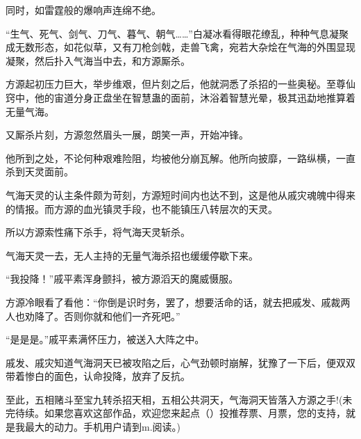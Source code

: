 \begin{this_body}
同时，如雷霆般的爆响声连绵不绝。

“生气、死气、剑气、刀气、暮气、朝气……”白凝冰看得眼花缭乱，种种气息凝聚成无数形态，如花似草，又有刀枪剑戟，走兽飞禽，宛若大杂烩在气海的外围显现凝聚，然后扑入气海当中去，和方源厮杀。

方源起初压力巨大，举步维艰，但片刻之后，他就洞悉了杀招的一些奥秘。至尊仙窍中，他的宙道分身正盘坐在智慧蛊的面前，沐浴着智慧光晕，极其迅勐地推算着无量气海。

又厮杀片刻，方源忽然眉头一展，朗笑一声，开始冲锋。

他所到之处，不论何种艰难险阻，均被他分崩瓦解。他所向披靡，一路纵横，一直杀到天灵面前。

气海天灵的认主条件颇为苛刻，方源短时间内也达不到，这是他从戚灾魂魄中得来的情报。而方源的血光镇灵手段，也不能镇压八转层次的天灵。

所以方源索性痛下杀手，将气海天灵斩杀。

气海天灵一去，无人主持的无量气海杀招也缓缓停歇下来。

“我投降！”戚平素浑身颤抖，被方源滔天的魔威慑服。

方源冷眼看了看他：“你倒是识时务，罢了，想要活命的话，就去把戚发、戚裁两人也劝降了。否则你就和他们一齐死吧。”

“是是是。”戚平素满怀压力，被送入大阵之中。

戚发、戚灾知道气海洞天已被攻陷之后，心气劲顿时崩解，犹豫了一下后，便双双带着惨白的面色，认命投降，放弃了反抗。

至此，五相赌斗至宝九转杀招天相，五相公共洞天，气海洞天皆落入方源之手!(未完待续。如果您喜欢这部作品，欢迎您来起点（）投推荐票、月票，您的支持，就是我最大的动力。手机用户请到m.阅读。)

\end{this_body}

